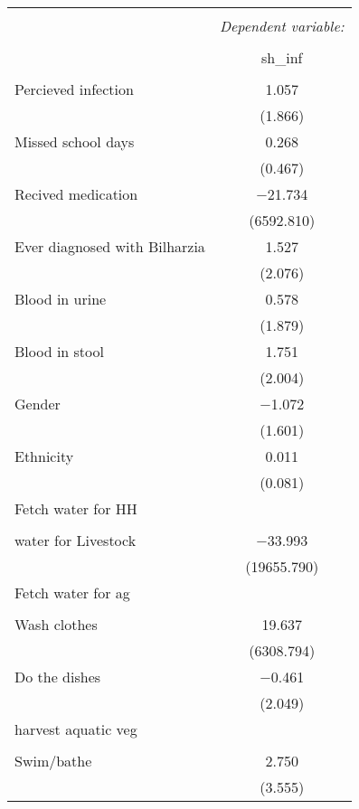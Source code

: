 
\begin{table}[!htbp] \centering 
  \caption{} 
  \label{} 
\begin{tabular}{@{\extracolsep{3pt}}lc} 
\\[-1.8ex]\hline 
\hline \\[-1.8ex] 
 & \multicolumn{1}{c}{\textit{Dependent variable:}} \\ 
\cline{2-2} 
\\[-1.8ex] & sh\_inf \\ 
\hline \\[-1.8ex] 
 Percieved infection & 1.057 \\ 
  & (1.866) \\ 
  Missed school days & 0.268 \\ 
  & (0.467) \\ 
  Recived medication & $-$21.734 \\ 
  & (6592.810) \\ 
  Ever diagnosed with Bilharzia & 1.527 \\ 
  & (2.076) \\ 
  Blood in urine & 0.578 \\ 
  & (1.879) \\ 
  Blood in stool & 1.751 \\ 
  & (2.004) \\ 
  Gender & $-$1.072 \\ 
  & (1.601) \\ 
  Ethnicity & 0.011 \\ 
  & (0.081) \\ 
  Fetch water for HH &  \\ 
  &  \\ 
  water for Livestock & $-$33.993 \\ 
  & (19655.790) \\ 
  Fetch water for ag &  \\ 
  &  \\ 
  Wash clothes & 19.637 \\ 
  & (6308.794) \\ 
  Do the dishes & $-$0.461 \\ 
  & (2.049) \\ 
  harvest aquatic veg &  \\ 
  &  \\ 
  Swim/bathe & 2.750 \\ 
  & (3.555) \\ 

\end{tabular}
\end{table}
